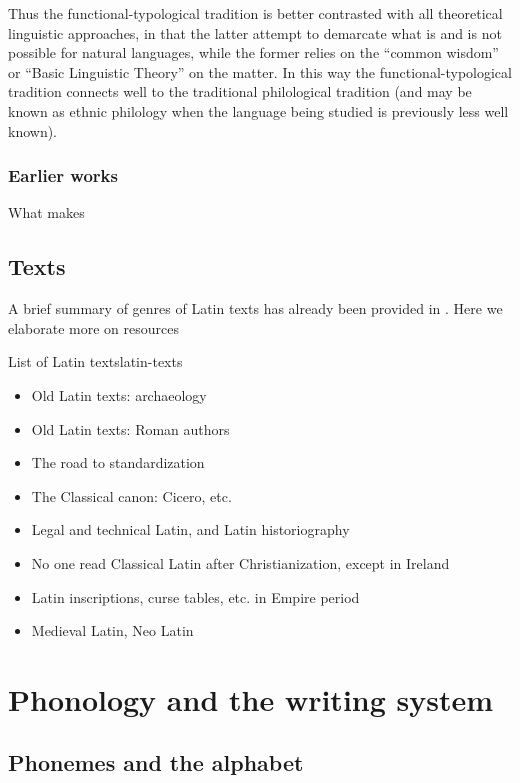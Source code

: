 \documentclass[a4paper, oneside, 12pt]{report}
\begin{document}
Thus the functional-typological tradition is better contrasted with all theoretical linguistic approaches,
in that the latter attempt to demarcate what is and is not possible for natural languages,
while the former relies on the ``common wisdom'' or ``Basic Linguistic Theory'' \citep{dixon2009basic1} on the matter.
In this way the functional-typological tradition connects well to the traditional philological tradition 
(and may be known as ethnic philology when the language being studied is previously less well known).

\subsection{Earlier works}

What makes 

\section{Texts}

A brief summary of genres of Latin texts has already been provided in .
Here we elaborate more on resources

\begin{todobox}{List of Latin texts}{latin-texts}
 \begin{itemize}
    \item Old Latin texts: archaeology
    \item Old Latin texts: Roman authors
    \item The road to standardization
    \item The Classical canon: Cicero, etc.
    \item Legal and technical Latin, and Latin historiography
    \item No one read Classical Latin after Christianization, except in Ireland
    \item Latin inscriptions, curse tables, etc. in Empire period
    \item Medieval Latin, Neo Latin
\end{itemize}
   
\end{todobox}

\chapter{Phonology and the writing system}

\section{Phonemes and the alphabet}
\end{document}

